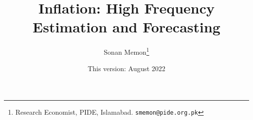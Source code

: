 \documentclass[12pt]{article}
\newcommand{\1}{\mathbbm 1}
\begin{document}
	
	
	
	
	
	
	\vspace{-0.5ex}
	
	
	
	
	
	
	
	
	\newpage{}
	
	
	
	
	
	
	\title{{Inflation: High Frequency Estimation and Forecasting  %
			}}
			
			
			
			\date{This version: August 2022}%
		
		
		\author{Sonan Memon\footnote{Research Economist, PIDE, Islamabad. \texttt{smemon@pide.org.pk}}}
		
		
		
		\newpage{}
		
		\maketitle
		\vspace{-2ex}
		
		
		
		
		
		
		
		
		
\end{document}
